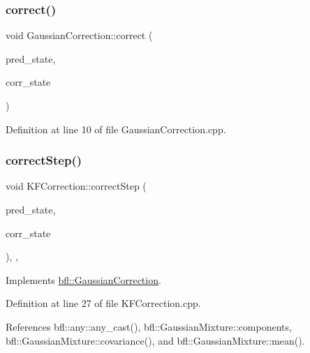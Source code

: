 \subsubsection{\texorpdfstring{correct()}{correct()}}
{\footnotesize\ttfamily void Gaussian\+Correction\+::correct (\begin{DoxyParamCaption}\item[{const \mbox{\hyperlink{classbfl_1_1GaussianMixture}{Gaussian\+Mixture}} \&}]{pred\+\_\+state,  }\item[{\mbox{\hyperlink{classbfl_1_1GaussianMixture}{Gaussian\+Mixture}} \&}]{corr\+\_\+state }\end{DoxyParamCaption})\hspace{0.3cm}{\ttfamily [inherited]}}



Definition at line 10 of file Gaussian\+Correction.\+cpp.

\mbox{\label{classbfl_1_1KFCorrection_ac97f8001212bd43071a1e4f2f7fe649d}} 
\subsubsection{\texorpdfstring{correct\+Step()}{correctStep()}}
{\footnotesize\ttfamily void K\+F\+Correction\+::correct\+Step (\begin{DoxyParamCaption}\item[{const \mbox{\hyperlink{classbfl_1_1GaussianMixture}{Gaussian\+Mixture}} \&}]{pred\+\_\+state,  }\item[{\mbox{\hyperlink{classbfl_1_1GaussianMixture}{Gaussian\+Mixture}} \&}]{corr\+\_\+state }\end{DoxyParamCaption})\hspace{0.3cm}{\ttfamily [override]}, {\ttfamily [protected]}, {\ttfamily [virtual]}}



Implements \mbox{\hyperlink{classbfl_1_1GaussianCorrection_af30322d949e8135e1ec243bd6df00c18}{bfl\+::\+Gaussian\+Correction}}.



Definition at line 27 of file K\+F\+Correction.\+cpp.



References bfl\+::any\+::any\+\_\+cast(), bfl\+::\+Gaussian\+Mixture\+::components, bfl\+::\+Gaussian\+Mixture\+::covariance(), and bfl\+::\+Gaussian\+Mixture\+::mean().

